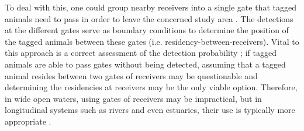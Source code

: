 \documentclass[preprint,12pt,authoryear]{elsarticle}
\begin{document}
\begin{spacing}{1.9}
To deal with this, one could group nearby receivers into a single gate that tagged animals need to pass in order to leave the concerned study area \citep{Heupel2006,Hobday2011EstimatingArrays,Steckenreuter2017,Kraus2018}. The detections at the different gates serve as boundary conditions to determine the position of  the tagged animals between these gates (i.e. residency-between-receivers). Vital to this approach is a correct assessment of the detection probability \citep{Hobday2011EstimatingArrays}; if tagged animals are able to pass gates without being detected, assuming that a tagged animal resides between two gates of receivers may be questionable and determining the residencies at receivers may be the only viable option. Therefore, in wide open waters, using gates of receivers may be impractical, but in longitudinal systems such as rivers and even estuaries, their use is typically more appropriate \citep{Heupel2006,Steckenreuter2017,Kraus2018,Dwyer2019UsingSpecies}.


\end{spacing}
\end{document}
